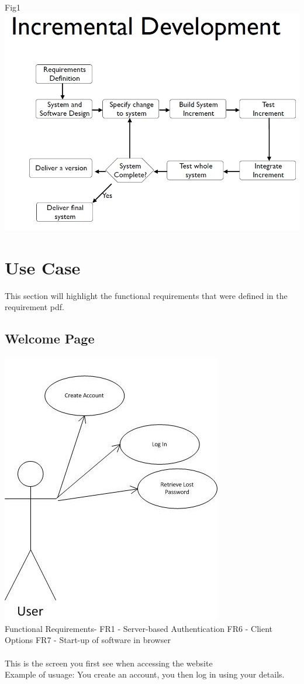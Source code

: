 \documentclass{project}
\begin{document}
Fig1
\includegraphics[scale=0.5]{incremental.jpg}\\

\newpage
\section{Use Case}
This section will highlight the functional requirements that were defined in the
requirement pdf.

\subsection{Welcome Page}
\includegraphics[scale=0.6]{WelcomePageUseCase.jpg}
\\
Functional Requirements-
FR1 - Server-based Authentication
FR6 - Client Options
FR7 - Start-up of software in browser
\\
\\
This is the screen you first see when accessing the website
\\
Example of usuage: You create an account, you then log in using your details.
\end{document}
